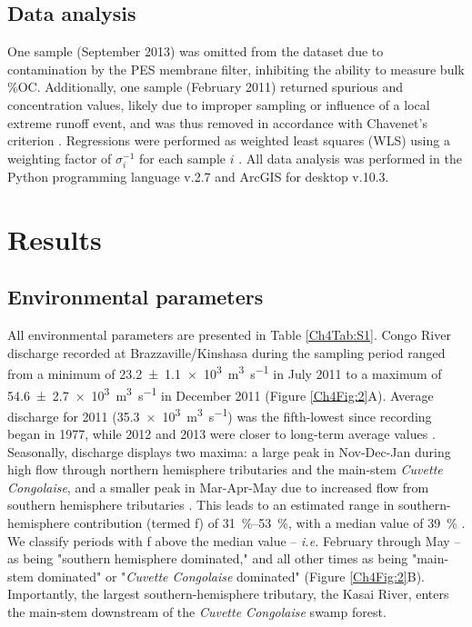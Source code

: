 \subsection{Data analysis}

One sample (September 2013) was omitted from the dataset due to contamination by the PES membrane filter, inhibiting the ability to measure bulk \%OC. Additionally, one sample (February 2011) returned spurious  and concentration values, likely due to improper sampling or influence of a local extreme runoff event, and was thus removed in accordance with Chavenet's criterion \citep{Glover:2011tl}. Regressions were performed as weighted least squares (WLS) using a weighting factor of $\sigma^{-1}_{i}$ for each sample $i$ \citep{Glover:2011tl}. All data analysis was performed in the Python programming language v.2.7 and ArcGIS for desktop v.10.3.

\section{Results}

\subsection{Environmental parameters}

All environmental parameters are presented in Table \ref{Ch4Tab:S1}. Congo River discharge recorded at Brazzaville/Kinshasa during the sampling period ranged from a minimum of \SI{23.2 \pm 1.1 e3}{\m^{3}.s^{-1}} in July 2011 to a maximum of \SI{54.6 \pm 2.7 e3}{m^{3}.s^{-1}} in December 2011 (Figure \ref{Ch4Fig:2}A). Average discharge for 2011 (\SI{35.3e3}{m^3.s^{-1}}) was the fifth-lowest since recording began in 1977, while 2012 and 2013 were closer to long-term average values \citep{Spencer:2012en}. Seasonally, discharge displays two maxima: a large peak in Nov-Dec-Jan during high flow through northern hemisphere tributaries and the main-stem \textit{Cuvette Congolaise}, and a smaller peak in Mar-Apr-May due to increased flow from southern hemisphere tributaries \citep{Bricquet:1993ve,Coynel:2005cn,Bouillon:2012cw,Spencer:2012en,Spencer:2014vp}. This leads to an estimated range in southern-hemisphere contribution (termed f) of \SIrange{31}{53}{\%}, with a median value of \SI{39}{\%} \citep{Bricquet:1993ve}. We classify periods with f above the median value -- \textit{\textit{i.e.}} February through May -- as being "southern hemisphere dominated," and all other times as being "main-stem dominated" or "\textit{Cuvette Congolaise} dominated" (Figure \ref{Ch4Fig:2}B). Importantly, the largest southern-hemisphere tributary, the Kasai River, enters the main-stem downstream of the \textit{Cuvette Congolaise} swamp forest.

